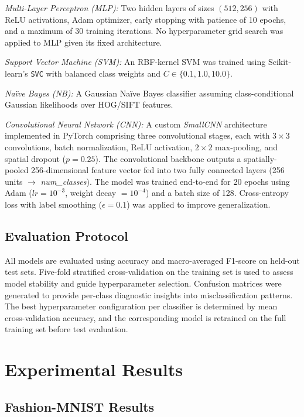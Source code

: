\documentclass[conference]{IEEEtran}
\begin{document}
\textit{Multi-Layer Perceptron (MLP):} Two hidden layers of sizes $(512, 256)$ with ReLU activations, Adam optimizer, early stopping with patience of 10 epochs, and a maximum of 30 training iterations. No hyperparameter grid search was applied to MLP given its fixed architecture.

\textit{Support Vector Machine (SVM):} An RBF-kernel SVM was trained using Scikit-learn's \texttt{SVC} with balanced class weights and $C \in \{0.1, 1.0, 10.0\}$.

\textit{Naïve Bayes (NB):} A Gaussian Naïve Bayes classifier assuming class-conditional Gaussian likelihoods over HOG/SIFT features.

\textit{Convolutional Neural Network (CNN):} A custom \textit{SmallCNN} architecture implemented in PyTorch \cite{paszke2019pytorch} comprising three convolutional stages, each with $3\times3$ convolutions, batch normalization, ReLU activation, $2\times2$ max-pooling, and spatial dropout ($p=0.25$). The convolutional backbone outputs a spatially-pooled 256-dimensional feature vector fed into two fully connected layers (256 units $\rightarrow$ \textit{num\_classes}). The model was trained end-to-end for 20 epochs using Adam ($lr = 10^{-3}$, weight decay $= 10^{-4}$) and a batch size of 128. Cross-entropy loss with label smoothing ($\epsilon = 0.1$) was applied to improve generalization.

\subsection{Evaluation Protocol}

All models are evaluated using accuracy and macro-averaged F1-score on held-out test sets. Five-fold stratified cross-validation on the training set is used to assess model stability and guide hyperparameter selection. Confusion matrices were generated to provide per-class diagnostic insights into misclassification patterns. The best hyperparameter configuration per classifier is determined by mean cross-validation accuracy, and the corresponding model is retrained on the full training set before test evaluation.

\section{Experimental Results}

\subsection{Fashion-MNIST Results}
\end{document}

